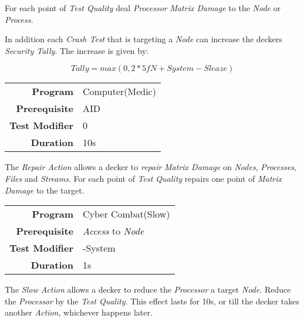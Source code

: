 \hfill

For each point of \emph{Test Quality} deal \emph{Processor} \emph{Matrix Damage}
to the \emph{Node} or \emph{Process}.

In addition each \emph{Crash Test} that is targeting a \emph{Node}
can increase the deckers \emph{Security Tally}.
The increase is given by:

\begin{equation*}
    \textit{Tally} = max(0, 2 * \textit{5fN} + \textit{System} - \textit{Sleaze})
\end{equation*}

\label{par:repair}


\begin{tabular}{rl}
    \textbf{Program}       & Computer(Medic) \\
    \textbf{Prerequisite}  & AID             \\
    \textbf{Test Modifier} & 0               \\
    \textbf{Duration}      & 10s             \\
\end{tabular}

\hfill

The \emph{Repair Action} allows a decker to \emph{repair} \emph{Matrix Damage}
on \emph{Nodes}, \emph{Processes}, \emph{Files} and \emph{Streams}.
For each point of \emph{Test Quality} repairs one point of \emph{Matrix Damage}
to the target.


\label{par:slow node}


\begin{tabular}{rl}
    \textbf{Program}       & Cyber Combat(Slow)           \\
    \textbf{Prerequisite}  & \emph{Access} to \emph{Node} \\
    \textbf{Test Modifier} & -System                      \\
    \textbf{Duration}      & 1s                           \\
\end{tabular}

\hfill

The \emph{Slow Action} allows a decker to reduce the \emph{Processor} a target
\emph{Node}. Reduce the \emph{Processor} by the \emph{Test Quality}. This effect
lasts for 10s, or till the decker takes another \emph{Action}, whichever happens
later.

\label{par:slow process}


